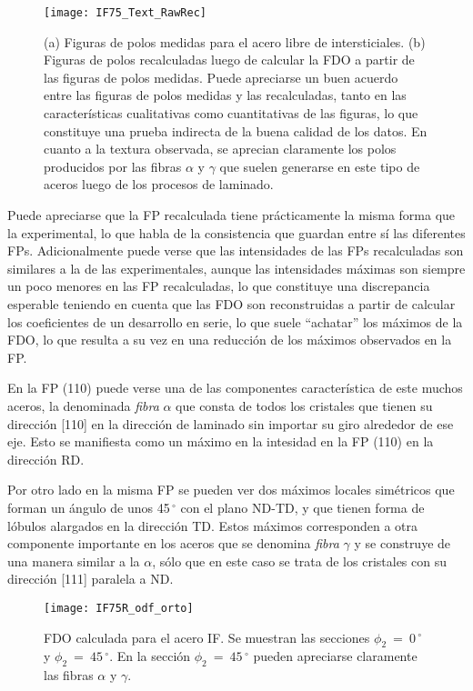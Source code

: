 \begin{figure}[!htb]
  \centering
  \texttt{[image: IF75\_Text\_RawRec]}
  \caption{(a) Figuras de polos medidas para el acero libre de intersticiales. (b) Figuras de polos recalculadas luego de calcular la FDO a partir de las figuras de polos medidas. Puede apreciarse un buen acuerdo entre las figuras de polos medidas y las recalculadas, tanto en las características cualitativas como cuantitativas de las figuras, lo que constituye una prueba indirecta de la buena calidad de los datos. En cuanto a la textura observada, se aprecian claramente los polos producidos  por las fibras $\alpha$ y $\gamma$ que suelen generarse en este tipo de aceros luego de los procesos de laminado.}
  \label{fig:IFTextRawRec}
\end{figure}

Puede apreciarse que la FP recalculada tiene prácticamente la misma forma que la experimental, lo que habla de la consistencia que guardan entre sí las diferentes FPs.
Adicionalmente puede verse que las intensidades de las FPs recalculadas son similares a la de las experimentales, aunque las intensidades máximas son siempre un poco menores en las FP recalculadas, lo que constituye una discrepancia esperable teniendo en cuenta que las FDO son reconstruidas a partir de calcular los coeficientes de un desarrollo en serie, lo que suele ``achatar'' los máximos de la FDO, lo que resulta a su vez en una reducción de los máximos observados en la FP.

En la FP (110) puede verse una de las componentes característica de este muchos aceros, la denominada \textit{fibra} $\alpha$ que consta de todos los cristales que tienen su dirección [110] en la dirección de laminado sin importar su giro alrededor de ese eje. Esto se manifiesta como un máximo en la intesidad en la FP (110) en la dirección RD.

Por otro lado en la misma FP se pueden ver dos máximos locales simétricos que forman un ángulo de unos 45\,$^{\circ}$ con el plano ND-TD, y que tienen forma de lóbulos alargados en la dirección TD. 
Estos máximos corresponden a otra componente importante en los aceros que se denomina \textit{fibra} $\gamma$ y se construye de una manera similar a la $\alpha$, sólo que en este caso se trata de los cristales con su dirección [111] paralela a ND.

\begin{figure}[!htb]
  \centering
  \texttt{[image: IF75R\_odf\_orto]}
  \caption{FDO calculada para el acero IF. Se muestran las secciones $\phi_2 \ = \ 0$\,$^{\circ}$ y $\phi_2 \ = \ 45$\,$^{\circ}$. En la sección $\phi_2 \ = \ 45$\,$^{\circ}$ pueden apreciarse claramente las fibras $\alpha$ y $\gamma$.}
  \label{fig:IFODF}
\end{figure}

